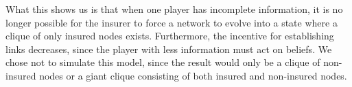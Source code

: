 What this shows us is that when one player has incomplete information, it is no longer possible for the insurer to force a network to evolve into a state where a clique of only insured nodes exists. Furthermore, the incentive for establishing links decreases, since the player with less information must act on beliefs.  
We chose not to simulate this model, since the result would only be a clique of non-insured nodes or a giant clique consisting of both insured and non-insured nodes.



